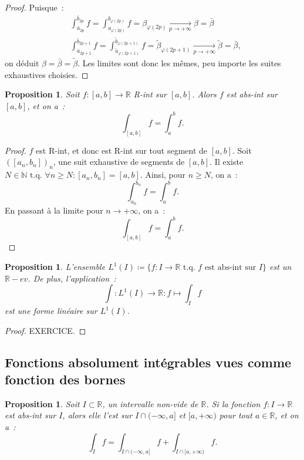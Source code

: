 \documentclass{report}
\newtheorem{prp}[thm]{Proposition}
\theoremstyle{definition}
\theoremstyle{remark}
\newcommand{\R}{\mathbb R}
\newcommand{\N}{\mathbb N}
\newcommand{\tq}{\text{ t.q. }}
\newcommand{\minfty}{{-\infty}}
\newcommand{\pinfty}{{+\infty}}
\begin{document}
\begin{proof}
			Puisque~:
			\begin{align*}
				&\int_{\bar a_{2p}}^{\bar b_{2p}}f = \int_{a_{\varphi(2p)}}^{b_{\varphi(2p)}}f = \beta_{\varphi(2p)} \xrightarrow[p \to \pinfty]{} \beta = \bar \beta \\
				&\int_{\bar a_{2p+1}}^{\bar b_{2p+1}} f = \int_{\widetilde a_{\varphi(2p+1)}}^{\widetilde b_{\varphi(2p+1)}} f
					= \widetilde \beta_{\varphi(2p+1)} \xrightarrow[p \to \pinfty]{} \widetilde \beta = \bar \beta,
			\end{align*}
			on déduit $\beta = \bar \beta = \widetilde \beta$. Les limites sont donc les mêmes, peu importe les suites exhaustives choisies.
			\end{proof}

			\begin{prp} Soit $f : [a, b] \to \R$ R-int sur $[a, b]$. Alors $f$ est abs-int sur $[a, b]$, et on a~:
			\[\int_{[a, b]} f = \int_a^b f.\]
			\end{prp}

			\begin{proof} $f$ est R-int, et donc est R-int sur tout segment de $[a, b]$. Soit $([a_n, b_n])_n$, une suit exhaustive de segments de $[a, b]$. Il existe
			$N \in \N \tq \forall n \geq N : [a_n, b_n] = [a, b]$. Ainsi, pour $n \geq N$, on a~:
			\[\int_{a_n}^{b_n} f = \int_a^b f.\]
			En passant à la limite pour $n \to \pinfty$, on a~:
			\[\int_{[a, b]} f = \int_a^b f.\]
			\end{proof}

			\begin{prp} L'ensemble $L^1(I) \coloneqq \{f : I \to \R \tq f \text{ est abs-int sur } I\}$ est un $\R-ev$. De plus, l'application~:
			\[\int : L^1(I) \to \R : f \mapsto \int_I f\]
			est une forme linéaire sur $L^1(I)$.
			\end{prp}

			\begin{proof} EXERCICE.
			\end{proof}

		\subsection{Fonctions absolument intégrables vues comme fonction des bornes}
			\begin{prp} Soit $I \subset \R$, un intervalle non-vide de $\R$. Si la fonction $f : I \to \R$ est abs-int sur $I$, alors elle l'est sur
			$I \cap (\minfty, a]$ et $[a, \pinfty)$ pour tout $a \in \R$, et on a~:
			\[\int_I f = \int_{I \cap (\minfty, a]} f + \int_{I \cap [a, \pinfty)} f.\]
			\end{prp}
\end{document}
